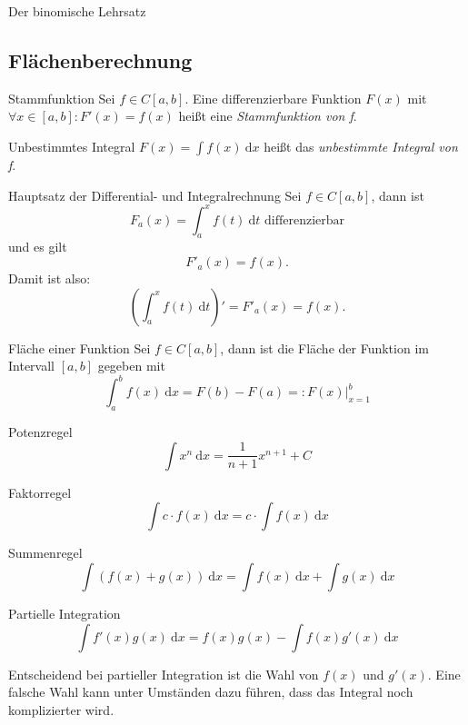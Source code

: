 \documentclass[german]{spicker}
\newcommand{\dx}{~\mathrm{d}x}
\newcommand{\dt}{~\mathrm{d}t}
\begin{document}
\begin{defi}{Der binomische Lehrsatz}
\subsection{Flächenberechnung}

\begin{defi}{Stammfunktion}
    Sei $f\in C[a, b]$. Eine differenzierbare Funktion $F(x)$ mit $\forall x\in [a, b] : F'(x) = f(x)$ heißt eine \emph{Stammfunktion von f}.
\end{defi}

\begin{defi}{Unbestimmtes Integral}
    $F(x) = \int f(x) \dx$ heißt das \emph{unbestimmte Integral von f}.
\end{defi}

\begin{defi}{Hauptsatz der Differential- und Integralrechnung}
    Sei $f\in C[a, b]$, dann ist
    $$
        F_a(x) = \int^x_a f(t)\dt \text{ differenzierbar}
    $$
    und es gilt
    $$
        F'_a(x) = f(x).
    $$
    Damit ist also:
    $$
        \left(\int^x_a f(t)\dt\right)' = F'_a(x) = f(x).
    $$
\end{defi}

\begin{defi}{Fläche einer Funktion}
    Sei $f \in C[a, b]$, dann ist die Fläche der Funktion im Intervall $[a, b]$ gegeben mit
    $$
        \int_a^b f(x) \dx = F(b) - F(a) =: \left.F(x)\right|^b_{x=1}
    $$
\end{defi}

\begin{bonus}{Potenzregel}
    $$
        \int x^n \dx = \frac{1}{n+1}x^{n+1} + C
    $$
\end{bonus}

\begin{bonus}{Faktorregel}
    $$
        \int c\cdot f(x) \dx = c\cdot \int f(x) \dx
    $$
\end{bonus}

\begin{bonus}{Summenregel}
    $$
        \int (f(x) + g(x))\dx = \int f(x) \dx + \int g(x) \dx
    $$
\end{bonus}

\begin{bonus}{Partielle Integration}
    $$
        \int f'(x)g(x) \dx = f(x)g(x) - \int f(x) g'(x) \dx
    $$

    Entscheidend bei partieller Integration ist die Wahl von $f(x)$ und $g'(x)$.
    Eine falsche Wahl kann unter Umständen dazu führen, dass das Integral noch komplizierter wird.


\end{bonus}
\end{defi}
\end{document}
